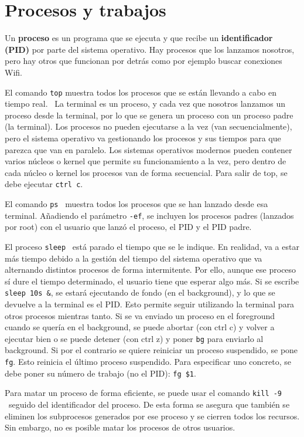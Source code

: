 \section{Procesos y trabajos}
Un \textbf{proceso} es un programa que se ejecuta y que recibe un \textbf{identificador (PID)} por parte del sistema operativo. Hay procesos que los lanzamos nosotros, pero hay otros que funcionan por detrás como por ejemplo buscar conexiones Wifi. 

El comando \texttt{top} muestra todos los procesos que se están llevando a cabo en tiempo real.  \ La terminal es un proceso, y cada vez que nosotros lanzamos un proceso desde la terminal, por lo que se genera un proceso con un proceso padre (la terminal). Los procesos no pueden ejecutarse a la vez (van secuencialmente), pero el sistema operativo va gestionando los procesos y sus tiempos para que parezca que van en paralelo. Los sistemas operativos modernos pueden contener varios núcleos o kernel que permite su funcionamiento a la vez, pero dentro de cada núcleo o kernel los procesos van de forma secuencial. Para salir de top, se debe ejecutar \texttt{ctrl c}.

El comando \texttt{ps} \marginpar[\footnotesize ps] \ muestra todos los procesos que se han lanzado desde esa terminal. Añadiendo el parámetro \texttt{-ef}, se incluyen los procesos padres (lanzados por root) con el usuario que lanzó el proceso, el PID y el PID padre.

El proceso \texttt{sleep}  \ está parado el tiempo que se le indique. En realidad, va a estar más tiempo debido a la gestión del tiempo del sistema operativo que va alternando distintos procesos de forma intermitente. Por ello, aunque ese proceso sí dure el tiempo determinado, el usuario tiene que esperar algo más. Si se escribe \texttt{sleep 10s \&}, se estará ejecutando de fondo (en el background), y lo que se devuelve a la terminal es el PID. Esto permite seguir utilizando la terminal para otros procesos mientras tanto. Si se va enviado un proceso en el foreground cuando se quería en el background, se puede abortar (con ctrl c) y volver a ejecutar bien o se puede detener (con ctrl z) y poner \texttt{bg} para enviarlo al background. Si por el contrario se quiere reiniciar un proceso suspendido, se pone \texttt{fg}. Esto reinicia el último proceso suspendido. Para especificar uno concreto, se debe poner su número de trabajo (no el PID): \texttt{fg \$1}. 

Para matar un proceso de forma eficiente, se puede usar el comando \texttt{kill -9}  \ seguido del identificador del proceso. De esta forma se asegura que también se eliminen los subprocesos generados por ese proceso y se cierren todos los recursos. Sin embargo, no es posible matar los procesos de otros usuarios.

